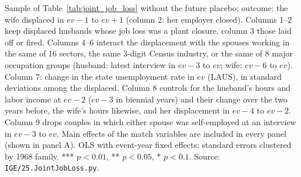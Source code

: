 \begin{table}[htbp]
\begin{minipage}{0.95\textwidth}\footnotesize Sample of Table~\ref{tab:joint_job_loss} without the future placebo; outcome: the wife displaced in $ev-1$ to $ev+1$ (column 2: her employer closed). Columns 1--2 keep displaced husbands whose job loss was a plant closure, column 3 those laid off or fired. Columns 4--6 interact the displacement with the spouses working in the same of 16 sectors, the same 3-digit Census industry, or the same of 8 major occupation groups (husband: latest interview in $ev-3$ to $ev$; wife: $ev-6$ to $ev$). Column 7: change in the state unemployment rate in $ev$ (LAUS), in standard deviations among the displaced. Column 8 controls for the husband's hours and labor income at $ev-2$ ($ev-3$ in biennial years) and their change over the two years before, the wife's hours likewise, and her displacement in $ev-4$ to $ev-2$. Column 9 drops couples in which either spouse was self-employed at an interview in $ev-3$ to $ev$. Main effects of the match variables are included in every panel (shown in panel A). OLS with event-year fixed effects; standard errors clustered by 1968 family. *** $p<0.01$, ** $p<0.05$, * $p<0.1$. Source: \texttt{IGE/25.JointJobLoss.py}.\end{minipage}
\end{table}

